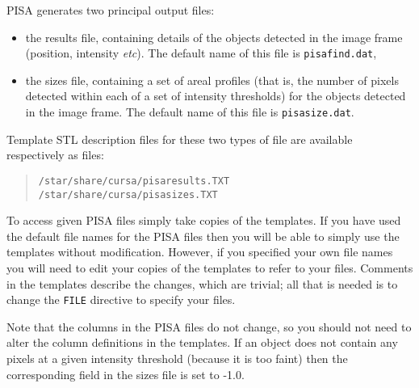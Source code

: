 \documentclass[twoside,11pt]{article}
\renewcommand{\_}{\texttt{\symbol{95}}}
\begin{document}
PISA generates two principal output files:

\begin{itemize}

  \item the results file, containing details of the objects detected
   in the image frame (position, intensity \emph{etc}\/).  The default name
   of this file is {\tt pisafind.dat},

  \item the sizes file, containing a set of areal profiles (that is,
   the number of pixels detected within each of a set of intensity
   thresholds) for the objects detected in the image frame.  The default
   name of this file is {\tt pisasize.dat}.

\end{itemize}

Template STL description files for these two types of file are
available respectively as files:

\begin{verse}
{\tt /star/share/cursa/pisaresults.TXT} \\
{\tt /star/share/cursa/pisasizes.TXT}
\end{verse}

To access given PISA files simply take copies of the templates.  If
you have used the default file names for the PISA files then you will
be able to simply use the templates without modification.  However,
if you specified your own file names you will need to edit your copies
of the templates to refer to your files.  Comments in the templates
describe the changes, which are trivial; all that is needed is to
change the {\tt FILE} directive to specify your files.

Note that the columns in the PISA files do not change, so you should
not need to alter the column definitions in the templates.  If an
object does not contain any pixels at a given intensity threshold
(because it is too faint) then the corresponding field in the sizes
file is set to -1.0.
\end{document}

